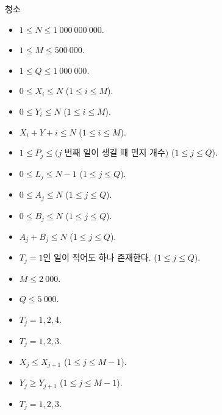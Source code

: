 \begin{problem}{청소}
	

	\Constraints


	\begin{itemize}
		
		\item $1 \le N \le 1\ 000\ 000\ 000$.
		\item $1 \le M \le 500\ 000$.
		\item $1 \le Q \le 1\ 000\ 000$.
		\item $0 \le X_i \le N$ ($1 \le i \le M$).
		\item $0 \le Y_i \le N$ ($1 \le i \le M$).
		\item $X_i + Y+i \le N$ ($1 \le i \le M$).
		\item $1 \le P_j \le (j$ 번째 일이 생길 때 먼지 개수$)$ ($1 \le j \le Q$).
		\item $0 \le L_j \le N-1$ ($1 \le j \le Q$).
		\item $0 \le A_j \le N$ ($1 \le j \le Q$).
		\item $0 \le B_j \le N$ ($1 \le j \le Q$).
		\item $A_j + B_j \le N$ ($1 \le j \le Q$).
		\item $T_j = 1$인 일이 적어도 하나 존재한다. ($1 \le j \le Q$).
	\end{itemize}


	\begin{itemize}
		\item $M \le 2\ 000$.
		\item $Q \le 5\ 000$.
	\end{itemize}

	
	\begin{itemize}
		\item $T_j = 1, 2, 4$.
	\end{itemize}


	\begin{itemize}
		\item $T_j = 1, 2, 3$.
		\item $X_j \le X_{j+1}$ ($1 \le j \le M-1$).
		\item $Y_j \ge Y_{j+1}$ ($1 \le j \le M-1$).
	\end{itemize}

	
	\begin{itemize}
		\item $T_j = 1, 2, 3$.
	\end{itemize}
	
	

\end{problem}
